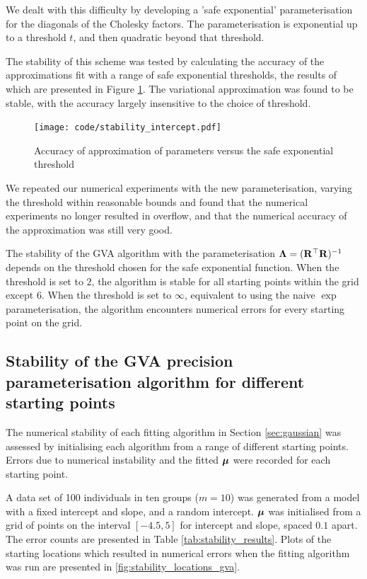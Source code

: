 			We dealt with this difficulty by developing a 'safe exponential' parameterisation for the diagonals of the
			Cholesky factors. The parameterisation is exponential up to a threshold $t$, and then quadratic beyond that
			threshold.
			
			The stability of this scheme was tested by calculating the accuracy of the approximations fit with a range
			of safe exponential thresholds, the results of which are presented in Figure \ref{fig:stability_accuracy}.
			The variational approximation was found to be stable, with the accuracy largely insensitive to the choice of
			threshold.
			
			\begin{figure}
				\texttt{[image: code/stability\_intercept.pdf]}
				\label{fig:stability_accuracy}
				\caption{Accuracy of approximation of parameters versus the safe exponential threshold}
			\end{figure}
			
			We repeated our numerical experiments with the new parameterisation, varying the threshold within reasonable
			bounds and found that the numerical experiments no longer resulted in overflow, and that the numerical accuracy
			of the approximation was still very good.
			
			The stability of the GVA algorithm with the parameterisation ${\boldsymbol \Lambda} = ({\bf R}^\top {\bf R})^{-1}$ depends on the
			threshold chosen for the safe exponential function. When the threshold is set to $2$, the algorithm is stable
			for all starting points within the grid except $6$. When the threshold is set to $\infty$, equivalent to using
			the naive $\exp$ parameterisation, the algorithm encounters numerical errors for every starting point on the 
			grid.
				
			\subsection{Stability of the GVA precision parameterisation algorithm for different starting points}
					
			The numerical stability of each fitting algorithm in Section \ref{sec:gaussian} was assessed by initialising
			each algorithm from a range of different starting points. Errors due to numerical instability and the fitted
			${\boldsymbol \mu}$ were recorded for each starting point.
					
			A data set of 100 individuals in ten groups ($m=10$) was generated from a model with a fixed intercept and
			slope, and a random intercept. ${\boldsymbol \mu}$ was initialised from a grid of points on the interval $[-4.5, 5]$ for
			intercept and slope, spaced $0.1$ apart. The error counts are presented in Table
			\ref{tab:stability_results}. Plots of the starting locations which resulted in numerical errors when the
			fitting algorithm was run are presented in \ref{fig:stability_locations_gva}.
					
